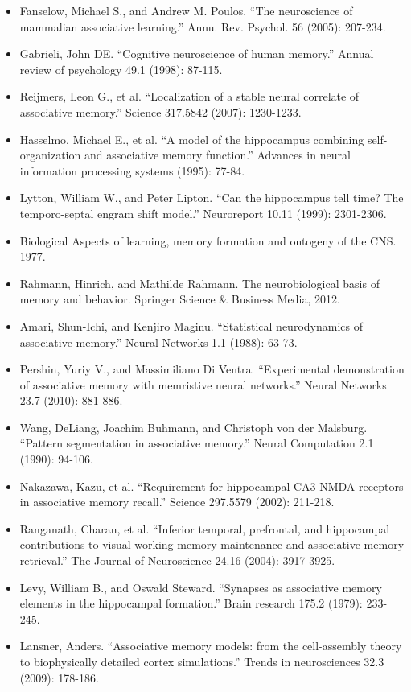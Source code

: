 \documentclass[12pt, a4paper]{article}
\begin{document}
\begin{itemize}
	\item Fanselow, Michael S., and Andrew M. Poulos. ``The neuroscience of mammalian associative learning.'' Annu. Rev. Psychol. 56 (2005): 207-234.
	\item Gabrieli, John DE. ``Cognitive neuroscience of human memory.'' Annual review of psychology 49.1 (1998): 87-115.
	\item Reijmers, Leon G., et al. ``Localization of a stable neural correlate of associative memory.'' Science 317.5842 (2007): 1230-1233.
	\item Hasselmo, Michael E., et al. ``A model of the hippocampus combining self-organization and associative memory function.'' Advances in neural information processing systems (1995): 77-84.
	\item Lytton, William W., and Peter Lipton. ``Can the hippocampus tell time? The temporo-septal engram shift model.'' Neuroreport 10.11 (1999): 2301-2306.
	\item Biological Aspects of learning, memory formation and ontogeny of the CNS. 1977.
	\item Rahmann, Hinrich, and Mathilde Rahmann. The neurobiological basis of memory and behavior. Springer Science \& Business Media, 2012.
	\item Amari, Shun-Ichi, and Kenjiro Maginu. ``Statistical neurodynamics of associative memory.'' Neural Networks 1.1 (1988): 63-73.
	\item Pershin, Yuriy V., and Massimiliano Di Ventra. ``Experimental demonstration of associative memory with memristive neural networks.'' Neural Networks 23.7 (2010): 881-886.
	\item Wang, DeLiang, Joachim Buhmann, and Christoph von der Malsburg. ``Pattern segmentation in associative memory.'' Neural Computation 2.1 (1990): 94-106.
	\item Nakazawa, Kazu, et al. ``Requirement for hippocampal CA3 NMDA receptors in associative memory recall.'' Science 297.5579 (2002): 211-218.
	\item Ranganath, Charan, et al. ``Inferior temporal, prefrontal, and hippocampal contributions to visual working memory maintenance and associative memory retrieval.'' The Journal of Neuroscience 24.16 (2004): 3917-3925.
	\item Levy, William B., and Oswald Steward. ``Synapses as associative memory elements in the hippocampal formation.'' Brain research 175.2 (1979): 233-245.
	\item Lansner, Anders. ``Associative memory models: from the cell-assembly theory to biophysically detailed cortex simulations.'' Trends in neurosciences 32.3 (2009): 178-186.

\end{itemize}
\end{document}
